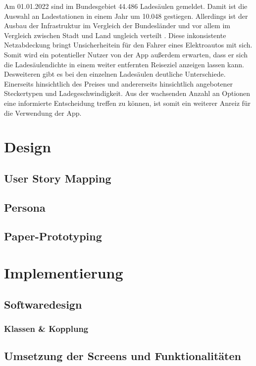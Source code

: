 \documentclass[12pt, a4paper, oneside]{article}
\begin{document}
Am 01.01.2022 sind im Bundesgebiet 44.486 Ladesäulen gemeldet. Damit ist die Auswahl an Ladestationen in einem Jahr um 10.048 gestiegen. Allerdings ist der Ausbau der Infrastruktur im Vergleich der Bundesländer und vor allem im Vergleich zwischen Stadt und Land ungleich verteilt \cite[]{Ladeinfrastruktur2022}. Diese inkonsistente Netzabdeckung bringt Unsicherheitein für den Fahrer eines Elektroautos mit sich. Somit wird ein potentieller Nutzer von der App außerdem erwarten, dass er sich die Ladesäulendichte in einem weiter entfernten Reiseziel anzeigen lassen kann.\\

Desweiteren gibt es bei den einzelnen Ladesäulen deutliche Unterschiede. Einerseits hinsichtlich des Preises und andererseits hinsichtlich angebotener Steckertypen und Ladegeschwindigkeit. Aus der wachsenden Anzahl an Optionen eine informierte Entscheidung treffen zu können, ist somit ein weiterer Anreiz für die Verwendung der App.\\

\section{Design}
\subsection{User Story Mapping}
\subsection{Persona}
\subsection{Paper-Prototyping}

\section{Implementierung}
\subsection{Softwaredesign}
\subsubsection{Klassen \& Kopplung}
\subsection{Umsetzung der Screens und Funktionalitäten}
\end{document}
